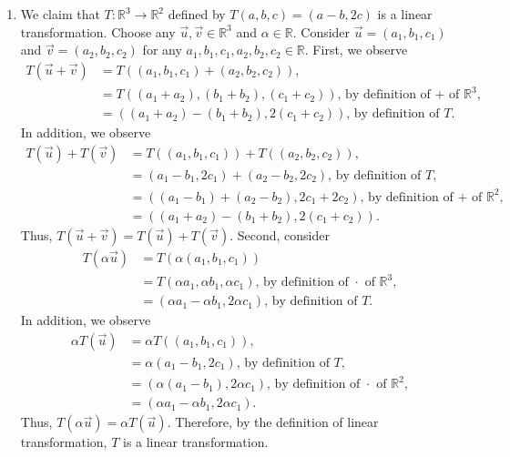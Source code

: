 \documentclass[12pt,answers]{exam}
\newcommand{\R}{\mathbb{R}}
\begin{document}
\begin{solution}
\begin{enumerate}[label=\roman*)]
\item We claim that $T:\R^{3}\rightarrow \R^{2}$ defined by $T(a,b,c)=(a-b,2c)$ is a linear transformation. Choose any $\vec{u},\vec{v}\in \R^{3}$ and $\alpha\in \R$. Consider $\vec{u}=(a_{1},b_{1},c_{1})$ and $\vec{v}=(a_{2},b_{2},c_{2})$ for any $a_{1},b_{1},c_{1},a_{2},b_{2},c_{2}\in \R$. First, we observe
\begin{align*}
	T(\vec{u}+\vec{v})&=T((a_{1},b_{1},c_{1})+(a_{2},b_{2},c_{2})), \\
  	&=T((a_{1}+a_{2}), (b_{1}+b_{2}), (c_{1}+c_{2})) \text{, by definition of + of $\R^{3}$,} \\
   	&=((a_{1}+a_{2})-(b_{1}+b_{2}),2(c_{1}+c_{2})) \text{, by definition of $T$.}
\end{align*}
In addition, we observe
\begin{align*}
	T(\vec{u})+T(\vec{v})&=T((a_{1},b_{1},c_{1}))+T((a_{2},b_{2},c_{2})), \\
    &=(a_{1}-b_{1},2c_{1})+(a_{2}-b_{2},2c_{2}) \text{, by definition of $T$,} \\
    &=((a_{1}-b_{1})+(a_{2}-b_{2}),2c_{1}+2c_{2}) \text{, by definition of + of $\R^{2}$,} \\
    &=((a_{1}+a_{2})-(b_{1}+b_{2}),2(c_{1}+c_{2})). 
\end{align*}
Thus, $T(\vec{u}+\vec{v})=T(\vec{u})+T(\vec{v})$. Second, consider
\begin{align*}
	T(\alpha \vec{u})&=T(\alpha(a_{1},b_{1},c_{1})) \\
    &=T(\alpha a_{1},\alpha b_{1},\alpha c_{1}) \text{, by definition of $\cdot$ of $\R^{3}$,} \\ 
    &=(\alpha a_{1}-\alpha b_{1},2\alpha c_{1}) \text{, by definition of $T$.}
\end{align*}
In addition, we observe
\begin{align*}
	\alpha T(\vec{u})&=\alpha T((a_{1},b_{1},c_{1})), \\
    &=\alpha (a_{1}-b_{1}, 2c_{1}) \text{, by definition of $T$,} \\
    &=(\alpha (a_{1}-b_{1}), 2\alpha c_{1}) \text{, by definition of $\cdot$ of $\R^{2}$,} \\
    &=(\alpha a_{1}-\alpha b_{1},2\alpha c_{1}).
\end{align*}
Thus, $T(\alpha \vec{u})=\alpha T(\vec{u})$. Therefore, by the definition of linear transformation, $T$ is a linear transformation.

\end{enumerate}
\end{solution}
\end{document}
